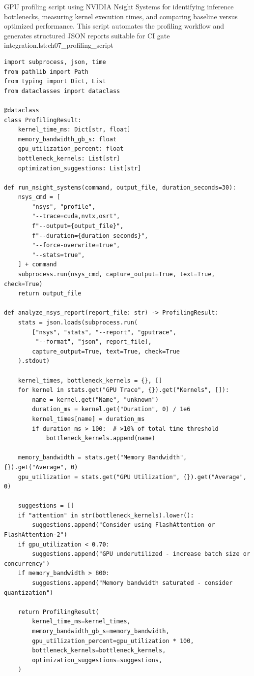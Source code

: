 \begin{codebox}{GPU profiling script using NVIDIA Nsight Systems for identifying inference bottlenecks, measuring kernel execution times, and comparing baseline versus optimized performance. This script automates the profiling workflow and generates structured JSON reports suitable for CI gate integration.}{lst:ch07_profiling_script}
\begin{verbatim}
import subprocess, json, time
from pathlib import Path
from typing import Dict, List
from dataclasses import dataclass

@dataclass
class ProfilingResult:
    kernel_time_ms: Dict[str, float]
    memory_bandwidth_gb_s: float
    gpu_utilization_percent: float
    bottleneck_kernels: List[str]
    optimization_suggestions: List[str]

def run_nsight_systems(command, output_file, duration_seconds=30):
    nsys_cmd = [
        "nsys", "profile",
        "--trace=cuda,nvtx,osrt",
        f"--output={output_file}",
        f"--duration={duration_seconds}",
        "--force-overwrite=true",
        "--stats=true",
    ] + command
    subprocess.run(nsys_cmd, capture_output=True, text=True, check=True)
    return output_file

def analyze_nsys_report(report_file: str) -> ProfilingResult:
    stats = json.loads(subprocess.run(
        ["nsys", "stats", "--report", "gputrace",
         "--format", "json", report_file],
        capture_output=True, text=True, check=True
    ).stdout)

    kernel_times, bottleneck_kernels = {}, []
    for kernel in stats.get("GPU Trace", {}).get("Kernels", []):
        name = kernel.get("Name", "unknown")
        duration_ms = kernel.get("Duration", 0) / 1e6
        kernel_times[name] = duration_ms
        if duration_ms > 100:  # >10% of total time threshold
            bottleneck_kernels.append(name)

    memory_bandwidth = stats.get("Memory Bandwidth", {}).get("Average", 0)
    gpu_utilization = stats.get("GPU Utilization", {}).get("Average", 0)

    suggestions = []
    if "attention" in str(bottleneck_kernels).lower():
        suggestions.append("Consider using FlashAttention or FlashAttention-2")
    if gpu_utilization < 0.70:
        suggestions.append("GPU underutilized - increase batch size or concurrency")
    if memory_bandwidth > 800:
        suggestions.append("Memory bandwidth saturated - consider quantization")

    return ProfilingResult(
        kernel_time_ms=kernel_times,
        memory_bandwidth_gb_s=memory_bandwidth,
        gpu_utilization_percent=gpu_utilization * 100,
        bottleneck_kernels=bottleneck_kernels,
        optimization_suggestions=suggestions,
    )


\end{verbatim}
\end{codebox}
